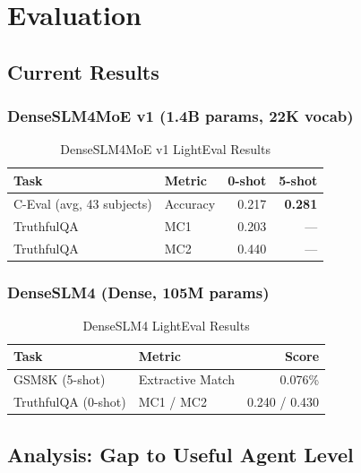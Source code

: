 \section{Evaluation}
\label{sec:evaluation}

\subsection{Current Results}

\subsubsection{DenseSLM4MoE v1 (1.4B params, 22K vocab)}

\begin{table}[h]
    \centering
    \caption{DenseSLM4MoE v1 LightEval Results}
    \begin{tabular}{llrr}
        \toprule
        \textbf{Task} & \textbf{Metric} & \textbf{0-shot} & \textbf{5-shot} \\
        \midrule
        C-Eval (avg, 43 subjects) & Accuracy & 0.217 & \textbf{0.281} \\
        TruthfulQA \citep{truthfulqa} & MC1 & 0.203 & --- \\
        TruthfulQA & MC2 & 0.440 & --- \\
        \bottomrule
    \end{tabular}
\end{table}

\subsubsection{DenseSLM4 (Dense, 105M params)}

\begin{table}[h]
    \centering
    \caption{DenseSLM4 LightEval Results}
    \begin{tabular}{llr}
        \toprule
        \textbf{Task} & \textbf{Metric} & \textbf{Score} \\
        \midrule
        GSM8K \citep{gsm8k} (5-shot) & Extractive Match & 0.076\% \\
        TruthfulQA (0-shot) & MC1 / MC2 & 0.240 / 0.430 \\
        \bottomrule
    \end{tabular}
\end{table}

\subsection{Analysis: Gap to Useful Agent Level}

